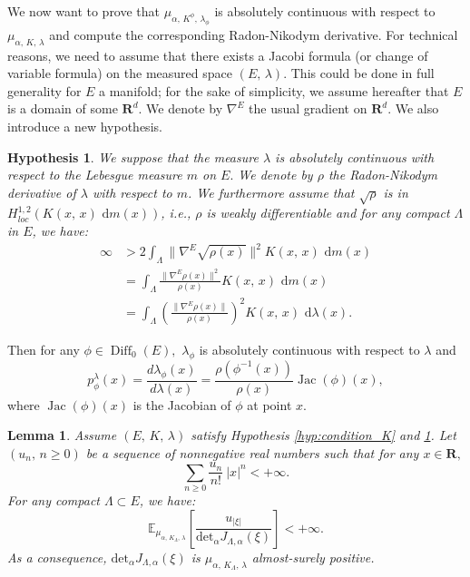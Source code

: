 \documentclass[11pt,a4paper]{amsart}
\newtheorem{Lemma}{Lemma}
\newtheorem{hyp}{Hypothesis}
\begin{document}
We now want to prove that $\mu_{\alpha, \, K^\phi, \, \lambda_\phi}$
is absolutely continuous with respect to $\mu_{\alpha, \, K,\,
  \lambda}$ and compute the corresponding Radon-Nikodym derivative.
For technical reasons, we need to assume that there exists a Jacobi
formula (or change of variable formula) on the measured space $(E, \,
\lambda)$. This could be done in full generality for $E$ a manifold;
for the sake of simplicity, we assume hereafter that $E$ is a domain
of some ${{\mathbf R}}^d$. We denote by $\nabla^E$ the usual gradient on
${{\mathbf R}}^d$. We also introduce a new hypothesis.
\begin{hyp}
  \label{Assumption:rhoC1}
  We suppose that the measure $\lambda$ is absolutely continuous with
  respect to the Lebesgue measure $m$ on $E.$ We denote by $\rho$ the
  Radon-Nikodym derivative of $\lambda$ with respect to $m$.  We
  furthermore assume that $\sqrt{\rho}$ is in $H^{1,2}_{loc}(K(x,\,
  x){\text{ d}} m(x))$, i.e., $\rho$ is weakly differentiable and for any
  compact $\Lambda$ in $E$, we have:
  \begin{align*}
    \infty &> 2\int_\Lambda \|\nabla^E\sqrt{\rho(x)}\|^2 K(x,\, x){\text{ d}} m(x)\\
    &=  \int_\Lambda \frac{\| \nabla^E \rho(x)\|^2}{\rho(x)}K(x,\, x){\text{ d}} m(x)\\
    &=\int_\Lambda \left(\frac{\| \nabla^E
        \rho(x)\|}{\rho(x)}\right)^2K(x,\, x){\text{ d}} \lambda(x).
  \end{align*}
\end{hyp}
Then for any $\phi \in {\operatorname{Diff}}_0(E),$ $\lambda_\phi$ is absolutely
continuous with respect to $\lambda$ and
\begin{equation*}
  p^{\lambda}_{\phi}(x)=\frac{d\lambda_{\phi}(x)}{d\lambda(x)}
  =\frac{\rho(\phi^{-1}(x))}{\rho(x)}{\operatorname{Jac}}(\phi)(x),
\end{equation*}
where ${\operatorname{Jac}}(\phi)(x)$ is the Jacobian of $\phi$ at point $x.$
\begin{Lemma}
  \label{lem:determinant_positive}
  Assume $(E,\, K,\, \lambda)$ satisfy Hypothesis
  \ref{hyp:condition_K} and \ref{Assumption:rhoC1}. Let $(u_n, \, n\ge
  0)$ be a sequence of nonnegative real numbers such that for any
  $x\in{{\mathbf R}},$
  \begin{equation}\label{equ:non_negative_numbers}
    \sum_{n\ge 0} \frac{u_n}{n!}\ |x|^n < +\infty.
  \end{equation}
  For any compact $\Lambda\subset E$, we have:
  \begin{equation}
    {{\mathbb E}_{{\mu_{\alpha,\, K_\Lambda, \, \lambda}}}\left[{{\frac{u_{|\xi|}}{{{\text{det}}}_{\alpha} J_{\Lambda,\alpha}(\xi)}}}\right]}< + \infty.
  \end{equation}
  As a consequence, ${{\text{det}}}_{\alpha} J_{\Lambda,\alpha}(\xi)$ is
  $\mu_{\alpha,\, K_\Lambda, \, \lambda}$ almost-surely positive.
\end{Lemma}
\end{document}
